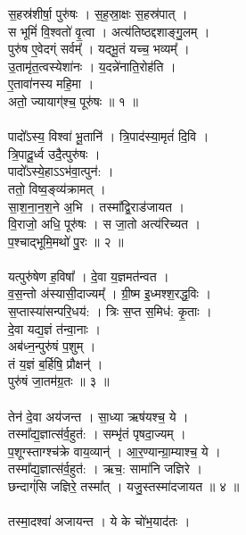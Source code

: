 \subsection{}
\\
स॒हस्र॑शीर्षा॒ पुरु॑षः । स॒ह॒स्रा॒क्षः स॒हस्र॑पात् ।\\
स भूमिं॑ वि॒श्वतो॑ वृ॒त्वा । अत्य॑तिष्ठद्दशाङ्गु॒लम् ।\\
पुरु॑ष ए॒वेदग्ं सर्वम्᳚ । यद्भू॒तं यच्च॒ भव्यम्᳚ ।\\
उ॒तामृ॑त॒त्वस्येशा॑नः । य॒दन्ने॑नाति॒रोह॑ति ।\\
ए॒तावा॑नस्य महि॒मा ।\\
अतो॒ ज्यायाग्॑श्च॒ पूरु॑षः ॥ १ ॥\\
\\
पादो᳚ऽस्य॒ विश्वा॑ भू॒तानि॑ । त्रि॒पाद॑स्या॒मृतं॑ दि॒वि ।\\
त्रि॒पादू॒र्ध्व उदै॒त्पुरु॑षः ।\\
पादो᳚ऽस्ये॒हाऽऽभ॑वा॒त्पुन॑: ।\\
ततो॒ विष्व॒ङ्व्य॑क्रामत् ।\\
सा॒श॒ना॒न॒श॒ने अ॒भि । तस्मा᳚द्वि॒राड॑जायत ।\\
वि॒राजो॒ अधि॒ पूरु॑षः । स जा॒तो अत्य॑रिच्यत ।\\
प॒श्चाद्भूमि॒मथो॑ पु॒रः ॥ २ ॥\\
\\
यत्पुरु॑षेण ह॒विषा᳚ । दे॒वा य॒ज्ञमत॑न्वत ।\\
व॒स॒न्तो अ॑स्यासी॒दाज्यम्᳚ । ग्री॒ष्म इ॒ध्मश्श॒रद्ध॒विः ।\\
स॒प्तास्या॑सन्परि॒धय॑: । त्रिः स॒प्त स॒मिध॑: कृ॒ताः ।\\
दे॒वा यद्य॒ज्ञं त॑न्वा॒नाः ।\\
अब॑ध्न॒न्पुरु॑षं प॒शुम् ।\\
तं य॒ज्ञं ब॒र्हिषि॒ प्रौक्षन्॑ ।\\
पुरु॑षं जा॒तम॑ग्र॒तः ॥ ३ ॥\\
\\
तेन॑ दे॒वा अय॑जन्त । सा॒ध्या ऋष॑यश्च॒ ये ।\\
तस्मा᳚द्य॒ज्ञात्स॑र्व॒हुत॑: । सम्भृ॑तं पृषदा॒ज्यम् ।\\
प॒शूग्‍स्ताग्‍श्च॑क्रे वाय॒व्यान्॑ । आ॒र॒ण्यान्ग्रा॒म्याश्च॒ ये ।\\
तस्मा᳚द्य॒ज्ञात्स॑र्व॒हुत॑: । ऋच॒: सामा॑नि जज्ञिरे ।\\
छन्दाग्ं॑सि जज्ञिरे॒ तस्मा᳚त् । यजु॒स्तस्मा॑दजायत ॥ ४ ॥\\
\\
तस्मा॒दश्वा॑ अजायन्त । ये के चो॑भ॒याद॑तः ।\\
